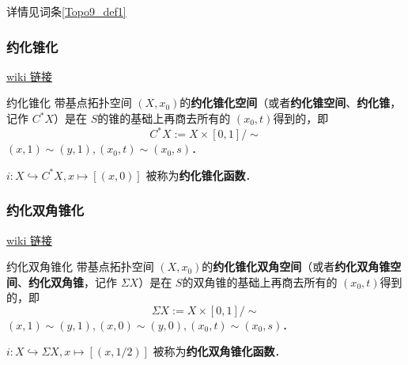 详情见词条\autoref{Topo9_def1}~


\subsubsection{约化锥化}

\href{https://en.wikipedia.org/wiki/Cone_(topology)\#Reduced_cone}{wiki 链接}

\begin{definition}{约化锥化}
带基点拓扑空间 $(X, x_0)$的\textbf{约化锥化空间}（或者\textbf{约化锥空间}、\textbf{约化锥}，记作 $C^* X$）是在 $S$的锥的基础上再商去所有的 $(x_0, t)$得到的，即
\[
    C^* X := X \times [0,1] / \sim
\]
$(x, 1) \sim (y, 1), (x_0, t) \sim (x_0, s)$．

$i: X \hookrightarrow C^* X, x \mapsto [(x, 0)]$ 被称为\textbf{约化锥化函数}．
\end{definition}

\subsubsection{约化双角锥化}

\href{https://en.wikipedia.org/wiki/Suspension_(topology)\#Reduced_suspension}{wiki 链接}

\begin{definition}{约化双角锥化}
带基点拓扑空间 $(X, x_0)$的\textbf{约化锥化双角空间}（或者\textbf{约化双角锥空间}、\textbf{约化双角锥}，记作 $\Sigma X$）是在 $S$的双角锥的基础上再商去所有的 $(x_0, t)$得到的，即
\[
    \Sigma X := X \times [0,1] / \sim
\]
$(x, 1) \sim (y, 1), (x, 0) \sim (y, 0), (x_0, t) \sim (x_0, s)$．

$i: X \hookrightarrow \Sigma X, x \mapsto [(x, 1/2)]$ 被称为\textbf{约化双角锥化函数}．
\end{definition}


